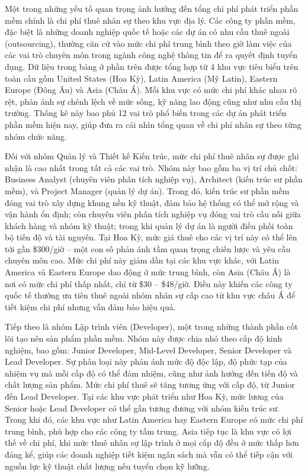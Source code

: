 \renewcommand{\labelitemi}{--}    
    
        Một trong những yếu tố quan trọng ảnh hưởng đến tổng chi phí phát triển phần mềm chính là chi phí thuê nhân sự theo khu vực địa lý. Các công ty phần mềm, đặc biệt là những doanh nghiệp quốc tế hoặc các dự án có nhu cầu thuê ngoài (outsourcing), thường căn cứ vào mức chi phí trung bình theo giờ làm việc của các vai trò chuyên môn trong ngành công nghệ thông tin để ra quyết định tuyển dụng. Dữ liệu trong bảng ở phần trên được tổng hợp từ 4 khu vực tiêu biểu trên toàn cầu gồm United States (Hoa Kỳ), Latin America (Mỹ Latin), Eastern Europe (Đông Âu) và Asia (Châu Á). Mỗi khu vực có mức chi phí khác nhau rõ rệt, phản ánh sự chênh lệch về mức sống, kỹ năng lao động cũng như nhu cầu thị trường. Thống kê này bao phủ 12 vai trò phổ biến trong các dự án phát triển phần mềm hiện nay, giúp đưa ra cái nhìn tổng quan về chi phí nhân sự theo từng nhóm chức năng.
    \vspace{0.5em}

    
      Đối với nhóm Quản lý và Thiết kế Kiến trúc, mức chi phí thuê nhân sự được ghi nhận là cao nhất trong tất cả các vai trò. Nhóm này bao gồm ba vị trí chủ chốt: Business Analyst (chuyên viên phân tích nghiệp vụ), Architect (kiến trúc sư phần mềm), và Project Manager (quản lý dự án). Trong đó, kiến trúc sư phần mềm đóng vai trò xây dựng khung nền kỹ thuật, đảm bảo hệ thống có thể mở rộng và vận hành ổn định; còn chuyên viên phân tích nghiệp vụ đóng vai trò cầu nối giữa khách hàng và nhóm kỹ thuật; trong khi quản lý dự án là người điều phối toàn bộ tiến độ và tài nguyên. Tại Hoa Kỳ, mức giá thuê cho các vị trí này có thể lên tới gần \$300/giờ – một con số phản ánh tầm quan trọng chiến lược và yêu cầu chuyên môn cao. Mức chi phí này giảm dần tại các khu vực khác, với Latin America và Eastern Europe dao động ở mức trung bình, còn Asia (Châu Á) là nơi có mức chi phí thấp nhất, chỉ từ \$30 – \$48/giờ. Điều này khiến các công ty quốc tế thường ưu tiên thuê ngoài nhóm nhân sự cấp cao từ khu vực châu Á để tiết kiệm chi phí nhưng vẫn đảm bảo hiệu quả.
    \vspace{0.5em}

    
      Tiếp theo là nhóm Lập trình viên (Developer), một trong những thành phần cốt lõi tạo nên sản phẩm phần mềm. Nhóm này được chia nhỏ theo cấp độ kinh nghiệm, bao gồm: Junior Developer, Mid-Level Developer, Senior Developer và Lead Developer. Sự phân loại này phản ánh mức độ độc lập, độ phức tạp của nhiệm vụ mà mỗi cấp độ có thể đảm nhiệm, cũng như ảnh hưởng đến tiến độ và chất lượng sản phẩm. Mức chi phí thuê sẽ tăng tương ứng với cấp độ, từ Junior đến Lead Developer. Tại các khu vực phát triển như Hoa Kỳ, mức lương của Senior hoặc Lead Developer có thể gần tương đương với nhóm kiến trúc sư. Trong khi đó, các khu vực như Latin America hay Eastern Europe có mức chi phí trung bình, phù hợp cho các công ty tầm trung. Asia tiếp tục là khu vực có lợi thế về chi phí, khi mức thuê nhân sự lập trình ở mọi cấp độ đều ở mức thấp hơn đáng kể, giúp các doanh nghiệp tiết kiệm ngân sách mà vẫn có thể tiếp cận với nguồn lực kỹ thuật chất lượng nếu tuyển chọn kỹ lưỡng.
    \vspace{0.5em}

